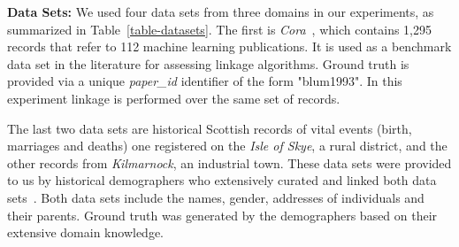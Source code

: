 \documentclass{llncs}
\begin{document}
\smallskip
\textbf{Data Sets:}
We used four data sets from three domains in our experiments, as
summarized in Table~\ref{table-datasets}. The first is
\emph{Cora}~\cite{Cora2017}, which contains 1,295
records that refer to 112 machine learning publications. 
It is used as a benchmark data set in the literature for assessing linkage algorithms. Ground truth is provided via a unique
\emph{paper\_id} identifier of the form "blum1993". In this experiment linkage is performed over the same set of records.

The last two data sets are historical Scottish records of vital
events (birth, marriages and deaths) one registered on the
\emph{Isle of Skye}, a rural district, and the other
records from \emph{Kilmarnock}, an industrial town. These data sets
were provided to us by historical demographers who extensively
curated and linked both data sets~\cite{reid2002,reid2006}. Both data
sets include the  names, gender, addresses of individuals and their
parents. Ground truth was generated by the demographers based on their
extensive domain knowledge.



\end{document}
